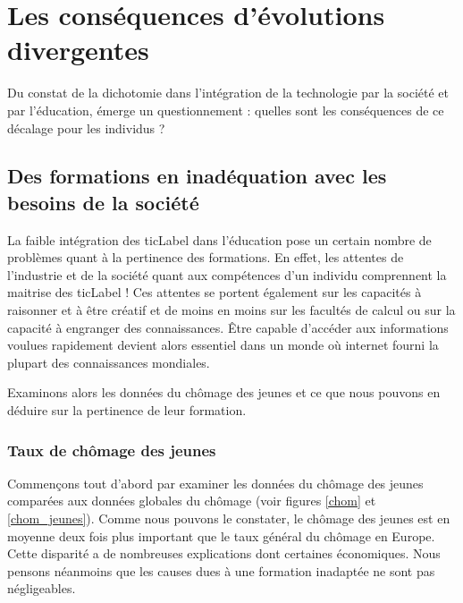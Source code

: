 
\chapter{Les conséquences d'évolutions divergentes}
Du constat de la dichotomie dans l'intégration de la technologie par la société et par l'éducation, émerge un questionnement : quelles sont les conséquences de ce décalage pour les individus ?



\section{Des formations en inadéquation avec les besoins de la société} %
La faible intégration des \gls{ticLabel} dans l'éducation pose un certain nombre de problèmes quant à la pertinence des formations. En effet, les attentes de l'industrie et de la société quant aux compétences d'un individu comprennent la maitrise des \gls{ticLabel} ! Ces attentes se portent également sur les capacités à raisonner et à être créatif et de moins en moins sur les facultés de calcul ou sur la capacité à engranger des connaissances. Être capable d'accéder aux informations voulues rapidement devient alors essentiel dans un monde où internet fourni la plupart des connaissances mondiales.

Examinons alors les données du chômage des jeunes et ce que nous pouvons en déduire sur la pertinence de leur formation.

\subsection{Taux de chômage des jeunes}
Commençons tout d'abord par examiner les données du chômage des jeunes comparées aux données globales du chômage (voir figures \ref{chom} et \ref{chom_jeunes}). Comme nous pouvons le constater, le chômage des jeunes est en moyenne deux fois plus important que le taux général du chômage en Europe. Cette disparité a de nombreuses explications dont certaines économiques. Nous pensons néanmoins que les causes dues à une formation inadaptée ne sont pas négligeables. 

